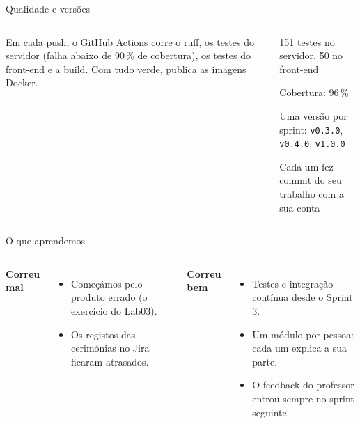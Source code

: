 \documentclass[aspectratio=169,11pt]{beamer}
\newcommand{\atualizar}[1]{\textcolor{laranja}{#1}}
\newcommand{\quemfala}{}
\newcommand{\fala}[2]{\renewcommand{\quemfala}{#1 · #2}}
\newcommand{\cartao}[1]{\colorbox{quadro}{\parbox{\dimexpr\linewidth-2\fboxsep\relax}{#1}}}
\begin{document}
\fala{Tiago}{30 s}
\begin{frame}{Qualidade e versões}
  \begin{columns}[T]
    \small
    Em cada push, o GitHub Actions corre o ruff, os testes do servidor (falha abaixo de 90\,\% de cobertura), os testes do front-end e a build. \atualizar{Com tudo verde, publica as imagens Docker.}
    \cartao{\small
      \atualizar{151} testes no servidor, \atualizar{50} no front-end\par
      Cobertura: \atualizar{96\,\%}\par
      Uma versão por sprint: \texttt{v0.3.0}, \texttt{v0.4.0}, \atualizar{\texttt{v1.0.0}}\par
      Cada um fez commit do seu trabalho com a sua conta}
  \end{columns}
\end{frame}

\fala{Tiago}{30 s}
\begin{frame}{O que aprendemos}
  \begin{columns}[T]
    \textbf{Correu mal}
    \begin{itemize}\small
      \item Começámos pelo produto errado (o exercício do Lab03).
      \item Os registos das cerimónias no Jira ficaram atrasados.
    \end{itemize}
    \textbf{Correu bem}
    \begin{itemize}\small
      \item Testes e integração contínua desde o Sprint 3.
      \item Um módulo por pessoa: cada um explica a sua parte.
      \item O feedback do professor entrou sempre no sprint seguinte.
    \end{itemize}
  \end{columns}
  \vspace{1em}
\end{frame}
\end{document}
